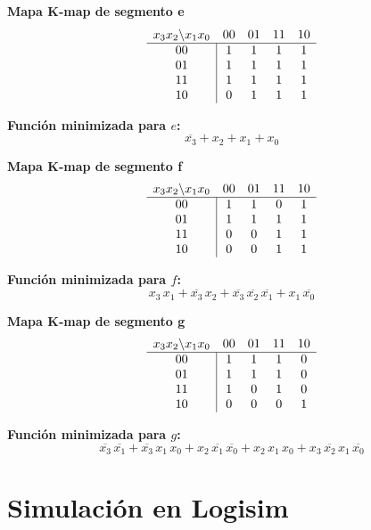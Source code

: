 \documentclass[12pt]{article}
\begin{document}
\noindent
\textbf{Mapa K‐map de segmento \textsf{e}}  
\[
\begin{array}{c|cccc}
\multicolumn{1}{c}{x_3x_2 \backslash x_1x_0} & 00 & 01 & 11 & 10 \\
\hline
00 & 1 & 1 & 1 & 1 \\
01 & 1 & 1 & 1 & 1 \\
11 & 1 & 1 & 1 & 1 \\
10 & 0 & 1 & 1 & 1 \\
\end{array}
\]
\vspace{1em}

\noindent
\textbf{Función minimizada para \(e\):}
\[
\overline{x_3} + x_2 + x_1 + x_0
\]

\noindent
\textbf{Mapa K‐map de segmento \textsf{f}}  
\[
\begin{array}{c|cccc}
\multicolumn{1}{c}{x_3x_2 \backslash x_1x_0} & 00 & 01 & 11 & 10 \\
\hline
00 & 1 & 1 & 0 & 1 \\
01 & 1 & 1 & 1 & 1 \\
11 & 0 & 0 & 1 & 1 \\
10 & 0 & 0 & 1 & 1 \\
\end{array}
\]
\vspace{1em}

\noindent
\textbf{Función minimizada para \(f\):}
\[
x_3\,x_1 + \overline{x_3}\,x_2 + \overline{x_3}\,\overline{x_2}\,\overline{x_1} + x_1\,\overline{x_0}
\]

\noindent
\textbf{Mapa K‐map de segmento \textsf{g}}  
\[
\begin{array}{c|cccc}
\multicolumn{1}{c}{x_3x_2 \backslash x_1x_0} & 00 & 01 & 11 & 10 \\
\hline
00 & 1 & 1 & 1 & 0 \\
01 & 1 & 1 & 1 & 0 \\
11 & 1 & 0 & 1 & 0 \\
10 & 0 & 0 & 0 & 1 \\
\end{array}
\]
\vspace{1em}

\noindent
\textbf{Función minimizada para \(g\):}
\[
\overline{x_3}\,\overline{x_1} + \overline{x_3}\,x_1\,x_0 + x_2\,\overline{x_1}\,\overline{x_0} + x_2\,x_1\,x_0 + x_3\,\overline{x_2}\,x_1\,\overline{x_0}
\]

\section{Simulación en Logisim}
\end{document}
